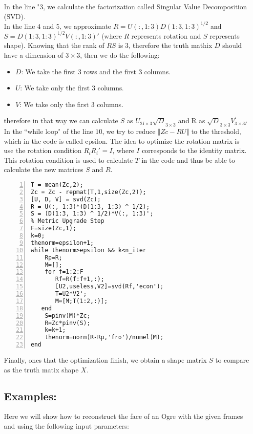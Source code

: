 \noindent In the line "$3$, we calculate the factorization called Singular Value Decomposition (SVD).\\
\noindent In the line $4$ and $5$, we approximate $R=U(:,1:3)D(1:3, 1:3)^{1/2}$ and $S=D(1:3, 1:3)^{1/2}V(:, 1:3)'$ (where $R$ represents rotation and $S$ represents shape). Knowing that the rank of $RS$ is 3, therefore the truth mathix $D$ should have a dimension of $3\times 3$, then we do the following:\\
\begin{itemize}
\item $D$: We take the first 3 rows and the first 3 columns.
\item $U$: We take only the first 3 columns.
\item $V$: We take only the first 3 columns.
\end{itemize}
\noindent therefore in that way we can calculate $S$ as $U_{2I\times 3}\sqrt{D}_{3\times 3}$ and R as $\sqrt{D}_{3\times 3}V^{'}_{3\times 3I}$\\

\noindent In the ``while loop" of the line $10$, we try to reduce $\Vert Zc-RU\Vert$  to the threshold, which in the code is called epsilon. The idea to optimize the rotation matrix is use the rotation condition $R_{i}R_{i}'=I$, where $I$ corresponds to the identity matrix. This rotation condition is used to calculate $T$ in the code and thus be able to calculate the new matrices $S$ and $R$.

\begin{lstlisting}[style=Matlab-editor, numbers=left]
T = mean(Zc,2);
Zc = Zc - repmat(T,1,size(Zc,2)); 
[U, D, V] = svd(Zc);
R = U(:, 1:3)*(D(1:3, 1:3) ^ 1/2); 
S = (D(1:3, 1:3) ^ 1/2)*V(:, 1:3)';
% Metric Upgrade Step
F=size(Zc,1);
k=0;
thenorm=epsilon+1;
while thenorm>epsilon && k<n_iter
    Rp=R;
    M=[];
    for f=1:2:F
       Rf=R(f:f+1,:);
       [U2,useless,V2]=svd(Rf,'econ');       
       T=U2*V2';
       M=[M;T(1:2,:)];
   end 
    S=pinv(M)*Zc;
    R=Zc*pinv(S);
    k=k+1;
    thenorm=norm(R-Rp,'fro')/numel(M);
end
\end{lstlisting}\label{lstlisting-codeT1}
\noindent Finally, ones that the optimization finish, we obtain a shape matrix $S$ to compare as the truth matix shape $X$.

\subsection{Examples:}
\noindent Here we will show how to reconstruct the face of an Ogre with the given frames and using the following input parameters:

